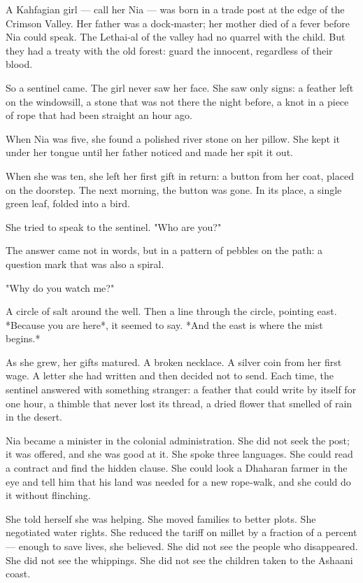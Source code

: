 \documentclass[10pt,twoside]{book}
\begin{document}
A Kahfagian girl --- call her Nia --- was born in a trade post at the edge of the Crimson Valley. Her father was a dock‑master; her mother died of a fever before Nia could speak. The Lethai‑al of the valley had no quarrel with the child. But they had a treaty with the old forest: guard the innocent, regardless of their blood.

So a sentinel came. The girl never saw her face. She saw only signs: a feather left on the windowsill, a stone that was not there the night before, a knot in a piece of rope that had been straight an hour ago.

When Nia was five, she found a polished river stone on her pillow. She kept it under her tongue until her father noticed and made her spit it out.

When she was ten, she left her first gift in return: a button from her coat, placed on the doorstep. The next morning, the button was gone. In its place, a single green leaf, folded into a bird.

She tried to speak to the sentinel. "Who are you?"

The answer came not in words, but in a pattern of pebbles on the path: a question mark that was also a spiral.

"Why do you watch me?"

A circle of salt around the well. Then a line through the circle, pointing east. *Because you are here*, it seemed to say. *And the east is where the mist begins.*

As she grew, her gifts matured. A broken necklace. A silver coin from her first wage. A letter she had written and then decided not to send. Each time, the sentinel answered with something stranger: a feather that could write by itself for one hour, a thimble that never lost its thread, a dried flower that smelled of rain in the desert.

Nia became a minister in the colonial administration. She did not seek the post; it was offered, and she was good at it. She spoke three languages. She could read a contract and find the hidden clause. She could look a Dhaharan farmer in the eye and tell him that his land was needed for a new rope‑walk, and she could do it without flinching.

She told herself she was helping. She moved families to better plots. She negotiated water rights. She reduced the tariff on millet by a fraction of a percent --- enough to save lives, she believed. She did not see the people who disappeared. She did not see the whippings. She did not see the children taken to the Ashaani coast.
\end{document}
